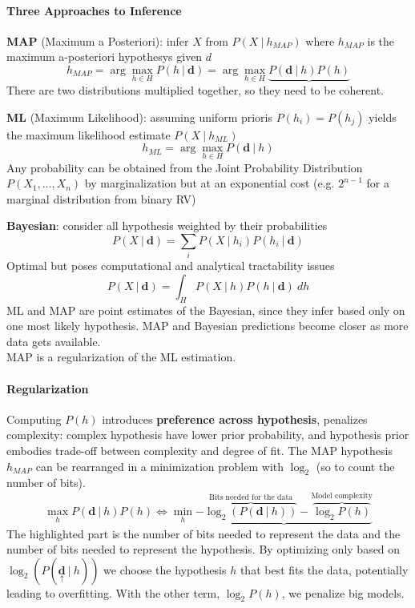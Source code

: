 \documentclass[10pt]{report}
\begin{document}
\paragraph{Three Approaches to Inference}
\begin{list}{}{}
	\item \textbf{MAP} (Maximum a Posteriori): infer $X$ from $P(X\:|\:h_{MAP})$ where $h_{MAP}$ is the maximum a-posteriori hypothesys given $d$
$$h_{MAP} = \arg\max_{h\in H} P(h\:|\:\mathbf{d}) = \arg\max_{h\in H}\underbrace{ P(\mathbf{d}\:|\:h)P(h)}$$
There are two distributions multiplied together, so they need to be coherent.
	\item \textbf{ML} (Maximum Likelihood): assuming uniform prioris $P(h_i)=P(h_j)$ yields the maximum likelihood estimate $P(X\:|\:h_{ML})$ $$h_{ML} = \arg\max_{h\in H} P(\mathbf{d}\:|\:h)$$
Any probability can be obtained from the Joint Probability Distribution $P(X_1,\ldots,X_n)$ by marginalization but at an exponential cost (e.g. $2^{n-1}$ for a marginal distribution from binary RV)
	\item \textbf{Bayesian}: consider all hypothesis weighted by their probabilities
$$P(X\:|\:\mathbf{d})=\sum_i P(X\:|\:h_i)P(h_i\:|\:\mathbf{d})$$
Optimal but poses computational and analytical tractability issues
$$P(X\:|\:\mathbf{d}) = \int_H P(X\:|\:h)P(h\:|\:\mathbf{d})\:dh$$
	ML and MAP are point estimates of the Bayesian, since they infer based only on one most likely hypothesis. MAP and Bayesian predictions become closer as more data gets available.\\
	MAP is a regularization of the ML estimation.
\end{list}
\paragraph{Regularization} Computing $P(h)$ introduces \textbf{preference across hypothesis}, penalizes complexity: complex hypothesis have lower prior probability, and hypothesis prior embodies trade-off between complexity and degree of fit.
The MAP hypothesis $h_{MAP}$ can be rearranged in a minimization problem with $\log_2$ (so to count the number of bits).
$$\max_h P(\mathbf{d}\:|\:h)P(h)\Leftrightarrow\min_h\underbrace{-\overset{\text{Bits needed for the data}}{\overbrace{\log_2(P(\mathbf{d}\:|\:h))}}-\overset{\text{Model complexity}}{\overbrace{\log_2P(h)}}}$$
The highlighted part is the number of bits needed to represent the data and the number of bits needed to represent the hypothesis. By optimizing only based on $\log_2(P(\underset{\uparrow}{\mathbf{d}}\:|\:h))$ we choose the hypothesis $h$ that best fits the data, potentially leading to overfitting. With the other term, $\log_2P(h)$, we penalize big models.
\end{document}
